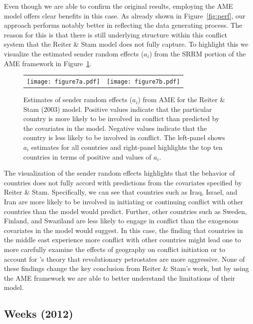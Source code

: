 \documentclass[12pt]{amsart}
\begin{document}
Even though we are able to confirm the original results, employing the AME model offers clear benefits in this case. As already shown in Figure~\ref{fig:perf}, our approach performs notably better in reflecting the data generating process. The reason for this is that there is still underlying structure within this conflict system that the Reiter \& Stam model does not fully capture. To highlight this we visualize the estimated sender random effects ($a_{i}$) from the SRRM portion of the AME framework in Figure~\ref{fig:reiter_stam_aEff}.

\begin{figure}[ht]
	\begin{tabular}{cc}
	\texttt{[image: figure7a.pdf]} &
	\texttt{[image: figure7b.pdf]} \\
	\end{tabular}
	\caption{Estimates of sender random effects ($a_{i}$) from AME for the Reiter \& Stam (2003) model. Positive values indicate that the particular country is more likely to be involved in conflict than predicted by the covariates in the model. Negative values indicate that the country is less likely to be involved in conflict. The left-panel shows $a_{i}$ estimates for all countries and right-panel highlights the top ten countries in terms of positive and values of $a_{i}$.}
	\label{fig:reiter_stam_aEff}
\end{figure}
\FloatBarrier

The visualization of the sender random effects highlights that the behavior of countries does not fully accord with predictions from the covariates specified by Reiter \& Stam. Specifically, we can see that countries such as Iraq, Israel, and Iran are more likely to be involved in initiating or continuing conflict with other countries than the model would predict. Further, other countries such as Sweden, Finland, and Swaziland are less likely to engage in conflict than the exogenous covariates in the model would suggest. In this case, the finding that countries in the middle east experience more conflict with other countries might lead one to more carefully examine the effects of geography on conflict initiation or to account for \citet{colgan:2010}'s theory that revolutionary petrostates are more aggressive. None of these findings change the key conclusion from Reiter \& Stam's work, but by using the AME framework we are able to better understand the limitations of their model.

\subsection{Weeks (2012)}
\end{document}

